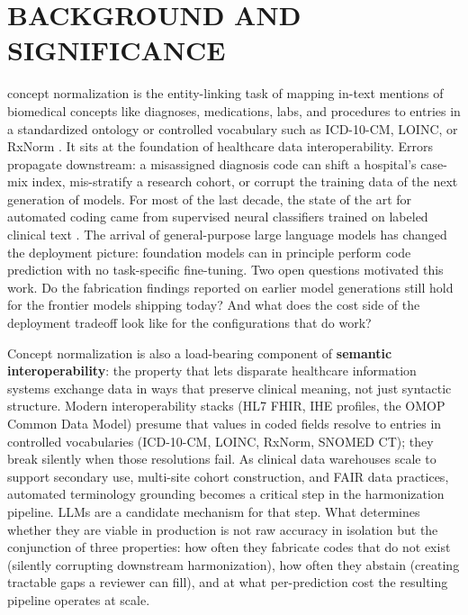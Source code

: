 \section{BACKGROUND AND SIGNIFICANCE}\label{background-and-significance}

 concept normalization is the entity-linking task of mapping
in-text mentions of biomedical concepts like diagnoses, medications,
labs, and procedures to entries in a standardized ontology or
controlled vocabulary such as ICD-10-CM, LOINC, or RxNorm
\autocite{Miftahutdinov2021,Xu2022}. It sits at the foundation of
healthcare data interoperability. Errors propagate downstream: a
misassigned diagnosis code can shift a hospital's case-mix index,
mis-stratify a research cohort, or corrupt the training data of the
next generation of models. For most of the last decade, the state
of the art for automated coding came from supervised neural
classifiers trained on labeled clinical text
\autocite{Mullenbach2018,Huang2022}. The arrival of general-purpose
large language models has changed the deployment picture: foundation
models can in principle perform code prediction with no task-specific
fine-tuning. Two open questions motivated this work. Do the
fabrication findings reported on earlier model generations still
hold for the frontier models shipping today? And what does the cost
side of the deployment tradeoff look like for the configurations
that do work?

Concept normalization is also a load-bearing component of
\textbf{semantic interoperability}: the property that lets disparate
healthcare information systems exchange data in ways that preserve
clinical meaning, not just syntactic structure. Modern interoperability
stacks (HL7 FHIR, IHE profiles, the OMOP Common Data Model) presume
that values in coded fields resolve to entries in controlled
vocabularies (ICD-10-CM, LOINC, RxNorm, SNOMED CT); they break
silently when those resolutions fail. As clinical data warehouses
scale to support secondary use, multi-site cohort construction, and
FAIR data practices, automated terminology grounding becomes a
critical step in the harmonization pipeline. LLMs are a candidate
mechanism for that step. What determines whether they are viable in
production is not raw accuracy in isolation but the conjunction of
three properties: how often they fabricate codes that do not exist
(silently corrupting downstream harmonization), how often they
abstain (creating tractable gaps a reviewer can fill), and at what
per-prediction cost the resulting pipeline operates at scale.

